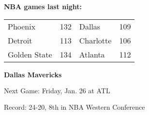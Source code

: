 \textbf{NBA games last night:
}\begin{tabular}{llll}
\toprule
     Phoenix & 132 &    Dallas & 109 \\
     Detroit & 113 & Charlotte & 106 \\
Golden State & 134 &   Atlanta & 112 \\
\bottomrule
\end{tabular}

\textbf{Dallas Mavericks}

Next Game: Friday, Jan. 26 at ATL

Record: 24-20, 8th in NBA Western Conference
